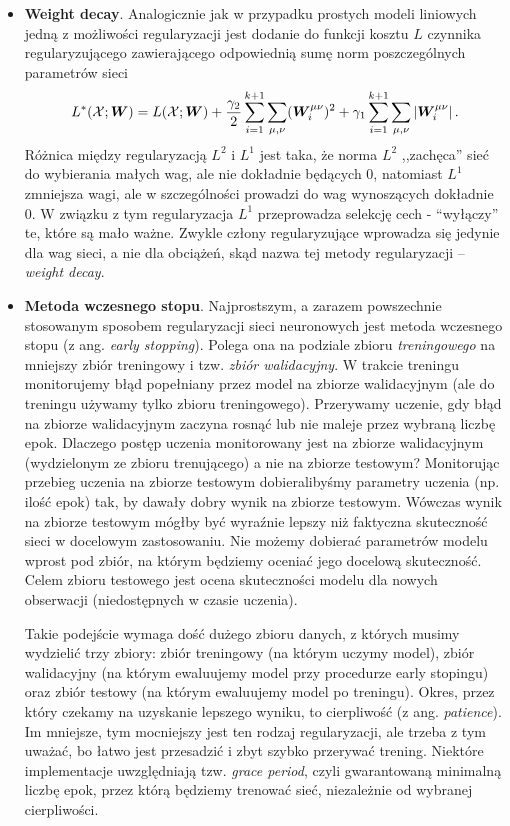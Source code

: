 \documentclass{myclass}
\numberwithin{equation}{subsection}
\begin{document}
\begin{itemize}
\item \textbf{Weight decay}. Analogicznie jak w przypadku prostych modeli liniowych jedną z
możliwości regularyzacji jest dodanie do funkcji kosztu \(L\) czynnika regularyzującego
zawierającego odpowiednią sumę norm poszczególnych parametrów sieci
\[
L^*(\mathcal{X}; \bm{W}) = L(\mathcal{X}; \bm{W}) + \frac{\gamma_2}{2}\sum_{i=1}^{k+1}\sum_{\mu,\nu} (\bm{W}_{i}^{\mu\nu})^2+ \gamma_1\sum_{i=1}^{k+1}\sum_{\mu,\nu} |\bm{W}_i^{\mu\nu}|\,.
\]
Różnica między regularyzacją \(L^2\) i \(L^1\) jest taka, że norma \(L^2\) ,,zachęca” sieć do
wybierania małych wag, ale nie dokładnie będących 0, natomiast \(L^1\) zmniejsza wagi, ale w
szczególności prowadzi do wag wynoszących dokładnie 0. W związku z tym regularyzacja \(L^1\)
przeprowadza selekcję cech - “wyłączy” te, które są mało ważne. Zwykle człony regularyzujące
wprowadza się jedynie dla wag sieci, a nie dla obciążeń, skąd nazwa tej metody regularyzacji --
\textit{weight decay}.

\item \textbf{Metoda wczesnego stopu}. Najprostszym, a zarazem powszechnie stosowanym sposobem
regularyzacji sieci neuronowych jest metoda wczesnego stopu (z ang. \textit{early stopping}). Polega
ona na podziale zbioru \emph{treningowego} na mniejszy zbiór treningowy i tzw. \emph{zbiór
walidacyjny}. W trakcie treningu monitorujemy błąd popełniany przez model na zbiorze walidacyjnym
(ale do treningu używamy tylko zbioru treningowego). Przerywamy uczenie, gdy błąd na zbiorze
walidacyjnym zaczyna rosnąć lub nie maleje przez wybraną liczbę epok. Dlaczego postęp uczenia
monitorowany jest na zbiorze walidacyjnym (wydzielonym ze zbioru trenującego) a nie na zbiorze
testowym? Monitorując przebieg uczenia na zbiorze testowym dobieralibyśmy parametry uczenia (np.
ilość epok) tak, by dawały dobry wynik na zbiorze testowym. Wówczas wynik na zbiorze testowym mógłby
być wyraźnie lepszy niż faktyczna skuteczność sieci w docelowym zastosowaniu. Nie możemy dobierać
parametrów modelu wprost pod zbiór, na którym będziemy oceniać jego docelową skuteczność. Celem
zbioru testowego jest ocena skuteczności modelu dla nowych obserwacji (niedostępnych w czasie
uczenia).

Takie podejście wymaga dość dużego zbioru danych, z których musimy wydzielić trzy zbiory: zbiór
treningowy (na którym uczymy model), zbiór walidacyjny (na którym ewaluujemy model przy procedurze
early stopingu) oraz zbiór testowy (na którym ewaluujemy model po treningu). Okres, przez który
czekamy na uzyskanie lepszego wyniku, to cierpliwość (z ang. \textit{patience}). Im mniejsze, tym
mocniejszy jest ten rodzaj regularyzacji, ale trzeba z tym uważać, bo łatwo jest przesadzić i zbyt
szybko przerywać trening. Niektóre implementacje uwzględniają tzw. \textit{grace period}, czyli
gwarantowaną minimalną liczbę epok, przez którą będziemy trenować sieć, niezależnie od wybranej
cierpliwości.


\end{itemize}
\end{document}
